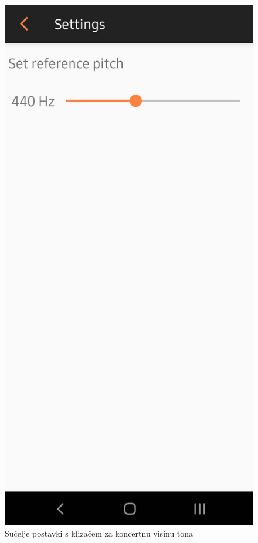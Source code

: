 \documentclass[times, utf8, zavrsni, numeric]{fer}
\begin{document}
\begin{figure}
	\centerline{\includegraphics[height=0.9\textheight]{zrtuner_options_440.jpeg}}
	\caption{Sučelje postavki s klizačem za koncertnu visinu tona}
	\label{fig}
\end{figure}
\end{document}
